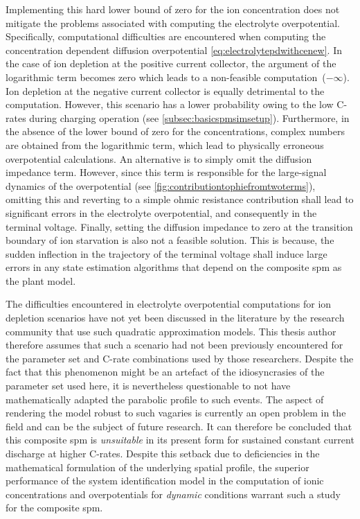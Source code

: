 Implementing  this  hard   lower  bound  of  zero  for   the  ion  concentration
does    not   mitigate    the   problems    associated   with    computing   the
electrolyte   overpotential.   Specifically,  computational   difficulties   are
encountered    when   computing    the    concentration   dependent    diffusion
overpotential \cref{eq:electrolytepdwithcenew}. In the case  of ion depletion at
the positive  current collector,  the argument of  the logarithmic  term becomes
zero which leads to a non-feasible computation~($-\infty$). Ion depletion at the
negative current collector  is equally detrimental to  the computation. However,
this scenario has  a lower probability owing to the  low C-rates during charging
operation (see \cref{subsec:basicspmsimsetup}).  Furthermore, in the  absence of
the lower  bound of zero  for the  concentrations, complex numbers  are obtained
from  the logarithmic  term, which  lead to  physically erroneous  overpotential
calculations. An  alternative is  to simply omit  the diffusion  impedance term.
However, since  this term is  responsible for  the large-signal dynamics  of the
overpotential (see \cref{fig:contributiontophiefromtwoterms}), omitting this and
reverting to  a simple ohmic  resistance contribution shall lead  to significant
errors  in  the electrolyte  overpotential,  and  consequently in  the  terminal
voltage.  Finally, setting  the diffusion  impedance to  zero at  the transition
boundary of ion starvation is also not a feasible solution. This is because, the
sudden inflection in  the trajectory of the terminal voltage  shall induce large
errors in any state estimation algorithms that depend on the composite \gls{spm}
as the plant model.

The  difficulties  encountered  in electrolyte  overpotential  computations  for
ion  depletion scenarios  have  not  yet been  discussed  in  the literature  by
the  research  community that  use  such  quadratic approximation  models.  This
thesis author  therefore assumes that  such a  scenario had not  been previously
encountered  for  the  parameter  set  and C-rate  combinations  used  by  those
researchers. Despite the  fact that this phenomenon might be  an artefact of the
idiosyncrasies of the  parameter set used here, it  is nevertheless questionable
to not  have mathematically adapted  the parabolic  profile to such  events. The
aspect  of rendering  the model  robust to  such vagaries  is currently  an open
problem in the field and can be the subject of future research. It can therefore
be concluded that  this composite \gls{spm} is \emph{unsuitable}  in its present
form for  sustained constant current  discharge at higher C-rates.  Despite this
setback due  to deficiencies in  the mathematical formulation of  the underlying
spatial profile, the superior performance  of the system identification model in
the computation  of ionic  concentrations and overpotentials  for \emph{dynamic}
conditions warrant such a study for the composite \gls{spm}.

